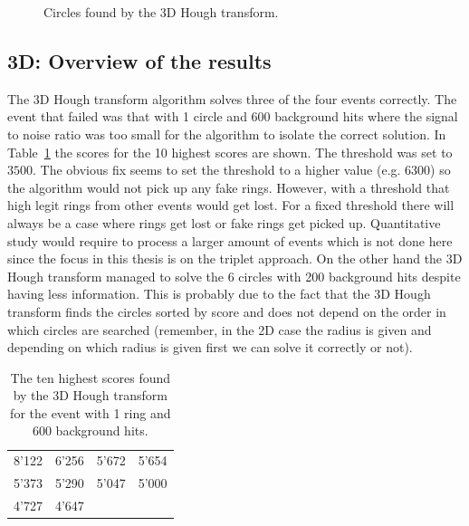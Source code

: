 \documentclass[11pt]{scrreprt}
\begin{document}
\begin{figure}[htp]
        \centering

        \caption[Circles found by the 3D Hough transform]{Circles found by the 3D Hough transform.\label{fig:3D_HT_results}}
\end{figure}


\subsection{3D: Overview of the results} %
\label{ssub:3d_overview_of_the_results}

The 3D Hough transform algorithm solves three of the four events correctly. The event that failed was that with 1 circle and 600 background hits where the signal to noise ratio was too small for the algorithm to isolate the correct solution. In Table~\ref{tab:3d_10_high_scores} the scores for the 10 highest scores are shown. The threshold was set to $3500$. The obvious fix seems to set the threshold to a higher value (e.g. $6300$) so the algorithm would not pick up any fake rings. However, with a threshold that high legit rings from other events would get lost. For a fixed threshold there will always be a case where rings get lost or fake rings get picked up. Quantitative study would require to process a larger amount of events which is not done here since the focus in this thesis is on the triplet approach. On the other hand the 3D Hough transform managed to solve the 6 circles with 200 background hits despite having less information. This is probably due to the fact that the 3D Hough transform finds the circles sorted by score and does not depend on the order in which circles are searched (remember, in the 2D case the radius is given and depending on which radius is given first we can solve it correctly or not).

\begin{table}[htp]
\centering
\caption[Circle scores for 1 ring 600 background hits]{The ten highest scores found by the 3D Hough transform for the event with 1 ring and 600 background hits.}
\label{tab:3d_10_high_scores}
\begin{tabular}{c|c|c|c}
\toprule
8'122 & 6'256 & 5'672 & 5'654 \\
5'373 & 5'290 & 5'047 & 5'000 \\
4'727 & 4'647 &  &  \\
\bottomrule
\end{tabular}
\end{table}
\end{document}

